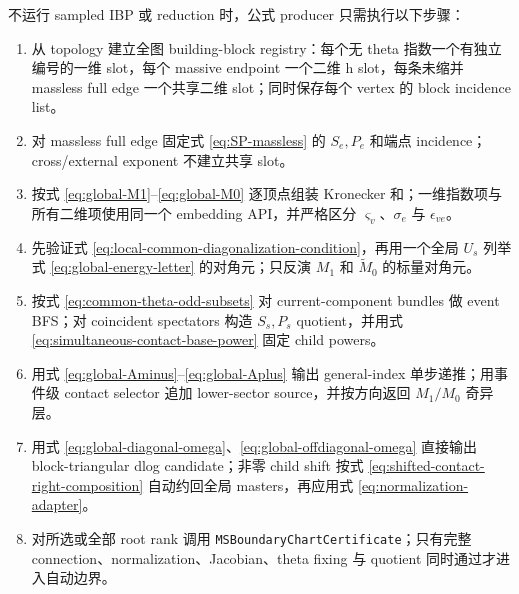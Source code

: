 \documentclass[11pt,a4paper]{ctexart}
\begin{document}
不运行 sampled IBP 或 reduction 时，公式 producer 只需执行以下步骤：
\begin{enumerate}[label=\arabic*.]
  \item 从 topology 建立全图 building-block registry：每个无 theta 指数一个有独立编号的一维 slot，每个 massive endpoint 一个二维 h slot，每条未缩并 massless full edge 一个共享二维 slot；同时保存每个 vertex 的 block incidence list。
  \item 对 massless full edge 固定式 \eqref{eq:SP-massless} 的 $S_e,P_e$ 和端点 incidence；cross/external exponent 不建立共享 slot。
  \item 按式 \eqref{eq:global-M1}--\eqref{eq:global-M0} 逐顶点组装 Kronecker 和；一维指数项与所有二维项使用同一个 embedding API，并严格区分 $\varsigma_v$、$\sigma_e$ 与 $\epsilon_{ve}$。
  \item 先验证式 \eqref{eq:local-common-diagonalization-condition}，再用一个全局 $U_s$ 列举式 \eqref{eq:global-energy-letter} 的对角元；只反演 $M_1$ 和 $\widetilde M_0$ 的标量对角元。
  \item 按式 \eqref{eq:common-theta-odd-subsets} 对 current-component bundles 做 event BFS；对 coincident spectators 构造 $S_s,P_s$ quotient，并用式 \eqref{eq:simultaneous-contact-base-power} 固定 child powers。
  \item 用式 \eqref{eq:global-Aminus}--\eqref{eq:global-Aplus} 输出 general-index 单步递推；用事件级 contact selector 追加 lower-sector source，并按方向返回 $M_1/M_0$ 奇异层。
  \item 用式 \eqref{eq:global-diagonal-omega}、\eqref{eq:global-offdiagonal-omega} 直接输出 block-triangular dlog candidate；非零 child shift 按式 \eqref{eq:shifted-contact-right-composition} 自动约回全局 masters，再应用式 \eqref{eq:normalization-adapter}。
  \item 对所选或全部 root rank 调用 \texttt{MSBoundaryChartCertificate}；只有完整 connection、normalization、Jacobian、theta fixing 与 quotient 同时通过才进入自动边界。
\end{enumerate}
\end{document}
